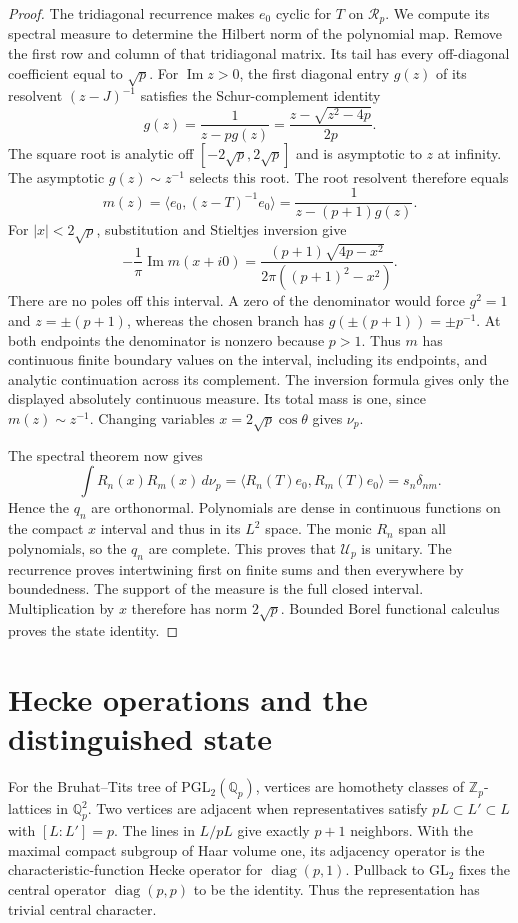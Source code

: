 \begin{proof}
The tridiagonal recurrence makes $e_0$ cyclic for $T$ on $\mathcal R_p$.
We compute its spectral measure to determine the Hilbert norm of the
polynomial map. Remove the first row and column of that tridiagonal
matrix. Its tail has every off-diagonal coefficient equal to $\sqrt p$.
For $\operatorname{Im}z>0$, the first diagonal entry $g(z)$ of its
resolvent $(z-J)^{-1}$ satisfies the Schur-complement identity
\[
 g(z)=\frac1{z-pg(z)}
      =\frac{z-\sqrt{z^2-4p}}{2p}.
\]
The square root is analytic off $[-2\sqrt p,2\sqrt p]$ and is asymptotic
to $z$ at infinity. The asymptotic $g(z)\sim z^{-1}$ selects this root.
The root resolvent therefore equals
\[
 m(z)=\langle e_0,(z-T)^{-1}e_0\rangle
      =\frac1{z-(p+1)g(z)}.
\]
For $|x|<2\sqrt p$, substitution and Stieltjes inversion give
\[
 -\frac1\pi\operatorname{Im}m(x+i0)
 =\frac{(p+1)\sqrt{4p-x^2}}
 {2\pi((p+1)^2-x^2)}.
\]
There are no poles off this interval. A zero of the denominator would
force $g^2=1$ and $z=\pm(p+1)$, whereas the chosen branch has
$g(\pm(p+1))=\pm p^{-1}$. At both endpoints the denominator is
nonzero because $p>1$. Thus $m$ has continuous finite boundary values
on the interval, including its endpoints, and analytic continuation
across its complement. The inversion formula gives only the displayed
absolutely continuous measure. Its total mass is one, since
$m(z)\sim z^{-1}$. Changing variables $x=2\sqrt p\cos\theta$
gives $\nu_p$.

The spectral theorem now gives
\[
 \int R_n(x)R_m(x)\,d\nu_p
 =\langle R_n(T)e_0,R_m(T)e_0\rangle
 =s_n\delta_{nm}.
\]
Hence the $q_n$ are orthonormal. Polynomials are dense in continuous
functions on the compact $x$ interval and thus in its $L^2$ space.
The monic $R_n$ span all polynomials, so the $q_n$ are complete.
This proves that $\mathcal U_p$ is unitary. The recurrence proves
intertwining first on finite sums and then everywhere by boundedness.
The support of the measure is the full closed interval. Multiplication
by $x$ therefore has norm $2\sqrt p$. Bounded Borel functional calculus
proves the state identity.
\end{proof}

\section{Hecke operations and the distinguished state}
\label{v4-arith:radial:hecke}

For the Bruhat--Tits tree of $\mathrm{PGL}_2(\mathbb Q_p)$, vertices are
homothety classes of $\mathbb Z_p$-lattices in $\mathbb Q_p^2$.
Two vertices are adjacent when representatives satisfy
$pL\subset L'\subset L$ with $[L:L']=p$.
The lines in $L/pL$ give exactly $p+1$ neighbors.
With the maximal compact subgroup of Haar volume one, its adjacency
operator is the characteristic-function Hecke operator for
$\operatorname{diag}(p,1)$. Pullback to $\mathrm{GL}_2$ fixes the
central operator $\operatorname{diag}(p,p)$ to be the identity.
Thus the representation has trivial central character.

